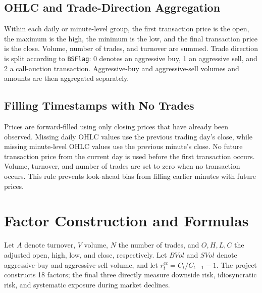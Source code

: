 \documentclass[a4paper,11pt,openany]{report}
\newcommand{\code}[1]{\texttt{#1}}
\begin{document}
\section{OHLC and Trade-Direction Aggregation}

Within each daily or minute-level group, the first transaction price is the open, the maximum is the high, the minimum is the low, and the final transaction price is the close. Volume, number of trades, and turnover are summed. Trade direction is split according to \code{BSFlag}: 0 denotes an aggressive buy, 1 an aggressive sell, and 2 a call-auction transaction. Aggressive-buy and aggressive-sell volumes and amounts are then aggregated separately.

\section{Filling Timestamps with No Trades}

Prices are forward-filled using only closing prices that have already been observed. Missing daily OHLC values use the previous trading day's close, while missing minute-level OHLC values use the previous minute's close. No future transaction price from the current day is used before the first transaction occurs. Volume, turnover, and number of trades are set to zero when no transaction occurs. This rule prevents look-ahead bias from filling earlier minutes with future prices.

\chapter{Factor Construction and Formulas}

Let $A$ denote turnover, $V$ volume, $N$ the number of trades, and $O,H,L,C$ the adjusted open, high, low, and close, respectively. Let $BVol$ and $SVol$ denote aggressive-buy and aggressive-sell volume, and let $r^{cc}_t=C_t/C_{t-1}-1$. The project constructs 18 factors; the final three directly measure downside risk, idiosyncratic risk, and systematic exposure during market declines.
\end{document}
